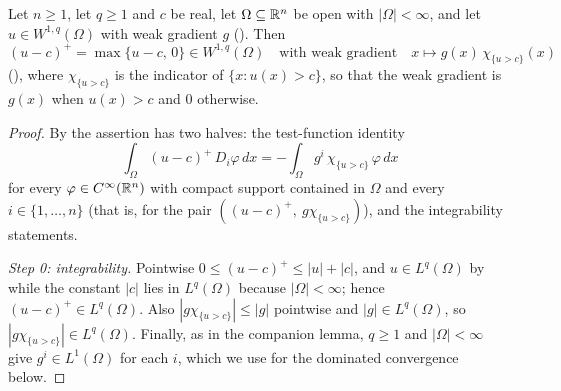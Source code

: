 \begin{lemma}
Let $n\ge1$, let $q\ge1$ and $c$ be real, let $\Omega\subseteq\mathbb{R}^n$ be open with
$|\Omega|<\infty$, and let $u\in W^{1,q}(\Omega)$ with weak gradient $g$
().  Then
\[
(u-c)^+=\max\{u-c,\,0\}\in W^{1,q}(\Omega)
\quad\text{with weak gradient}\quad
x\longmapsto g(x)\,\chi_{\{u>c\}}(x)
\]
(), where $\chi_{\{u>c\}}$ is the indicator of
$\{x:u(x)>c\}$, so that the weak gradient is $g(x)$ when $u(x)>c$ and $0$
otherwise.
\end{lemma}
\begin{proof}
By  the assertion has two halves: the test-function identity
\[
\int_\Omega(u-c)^+\,D_i\varphi\,dx=-\int_\Omega g^i\,\chi_{\{u>c\}}\,\varphi\,dx
\tag{1}
\]
for every $\varphi\in C^\infty(\mathbb{R}^n)$ with compact support contained in $\Omega$
and every $i\in\{1,\dots,n\}$ (that is,  for the pair
$((u-c)^+,\ g\chi_{\{u>c\}})$), and the integrability statements.

\emph{Step 0: integrability.}  Pointwise $0\le(u-c)^+\le|u|+|c|$, and
$u\in L^q(\Omega)$ by  while the constant $|c|$ lies in
$L^q(\Omega)$ because $|\Omega|<\infty$; hence $(u-c)^+\in L^q(\Omega)$.  Also
$|g\chi_{\{u>c\}}|\le|g|$ pointwise and $|g|\in L^q(\Omega)$, so
$|g\chi_{\{u>c\}}|\in L^q(\Omega)$.  Finally, as in the companion lemma,
$q\ge1$ and $|\Omega|<\infty$ give $g^i\in L^1(\Omega)$ for each $i$, which we
use for the dominated convergence below.


\end{proof}

